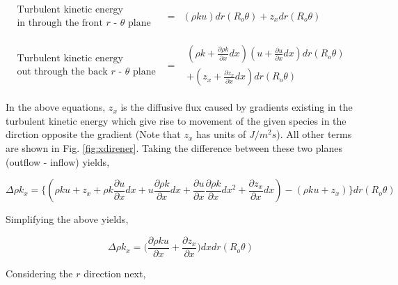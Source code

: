 \begin{displaymath}
	\begin{array}{ccc}
		\begin{array}{c}
			\textrm{Turbulent kinetic energy} \\ \textrm{in through the front $r$ - $\theta$ plane} 
		\end{array} & 
	= & (\rho k u)dr(R_o \theta) + z_x dr(R_o \theta)\\
	& \\ & \\
		\begin{array}{c}
			\textrm{Turbulent kinetic energy} \\ \textrm{out through the back $r$ - $\theta$ plane}
		\end{array} & 
	= & \begin{array}{c}
		(\rho k + \frac{\partial \rho k}{\partial x}dx)(u + \frac{\partial u}{\partial x}dx)dr(R_o \theta) \\
	+ (z_x + \frac{\partial z_x}{\partial x}dx)dr(R_o \theta)
		\end{array}
	\end{array}
\end{displaymath}

	In the above equations, $z_x$ is the diffusive flux caused by gradients existing in the turbulent kinetic
energy which give rise to movement of the given species in the dirction opposite the gradient
(Note that $z_x$ has units of $J/m^2 s$). All other terms are shown in Fig. \ref{fig:xdirener}.
Taking the difference between these two planes (outflow - inflow) yields,

\begin{displaymath}
	\Delta \rho k_x = \Big\{(\rho k u + z_x + \rho k \frac{\partial u}{\partial x}dx + u \frac{\partial \rho k}
	{\partial x}dx + \frac{\partial u}{\partial x} \frac{\partial \rho k}{\partial x}dx^2 + \frac{\partial z_x}
	{\partial x}dx) - (\rho k u + z_x)\Big\} dr(R_o \theta)
\end{displaymath}

	Simplifying the above yields,

\begin{displaymath}
	\Delta \rho k_x = \Big( \frac{\partial \rho k u}{\partial x} + \frac{\partial z_x}{\partial x}
	\Big)dxdr(R_o \theta)
\end{displaymath}

	Considering the $r$ direction next,

